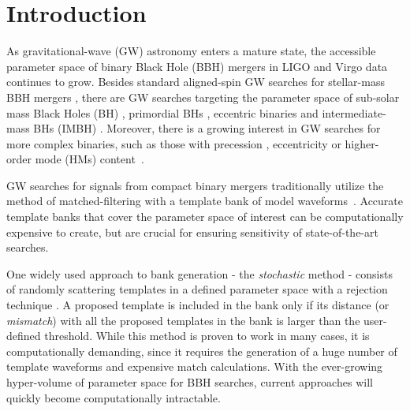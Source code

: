 \documentclass[twocolumn,showpacs,preprintnumbers,nofootinbib,prd,
superscriptaddress,10pt]{revtex4-2}
\begin{document}

\section{Introduction}

As gravitational-wave (GW) astronomy enters a mature state, the accessible parameter space of binary Black Hole (BBH) mergers in LIGO \cite{LIGOScientific:2014pky} and Virgo \cite{VIRGO:2014yos} data continues to grow. Besides standard aligned-spin GW searches for stellar-mass BBH mergers \cite{GWTC-1,GWTC-2,GWTC-2.1, GWTC-3}, there are GW searches targeting the parameter space of sub-solar mass Black Holes (BH) \cite{SSM_O2, SSM_O3a, PhysRevD.106.023024, Nitz:2021mzz}, primordial BHs \cite{PBH}, eccentric binaries \cite{PhysRevD.102.043005, PhysRevD.104.104016, Nitz:2019spj} and intermediate-mass BHs (IMBH) \cite{IMBH_O2, IMBH_O3, Chandra:2022ixv}. Moreover, there is a growing interest in GW searches for more complex binaries, such as those with precession \cite{PhysRevD.89.024010, Harry:2017weg, PhysRevD.102.041302, Indik:2016qky, Harry:2016ijz}, eccentricity \cite{LIGOScientific:2019dag, Ramos-Buades:2020eju, Wang:2021qsu, Nitz:2021mzz} or higher-order mode (HMs) content~\cite{CalderonBustillo:2015lrt, Harry:2017weg, Chandra_hom, 2021PhRvD.103b4042M}.

GW searches for signals from compact binary mergers traditionally utilize the method of matched-filtering with a template bank of model waveforms~\cite{Sathyaprakash:1991mt, Dhurandhar:1992mw, Owen:1998dk, Allen:2005fk, Babak:2006ty, Cokelaer:2007mv}. Accurate template banks that cover the parameter space of interest can be computationally expensive to create, but are crucial for ensuring sensitivity of state-of-the-art searches.

One widely used approach to bank generation - the {\it stochastic} method \cite{Harry:2009ea, PhysRevD.80.104014, Ajith:2012mn} - consists of randomly scattering templates in a defined parameter space with a rejection technique \cite{DalCanton:2017ala, Mukherjee:2018yra, Indik:2016qky, Lenon:2021zac}. A proposed template is included in the bank only if its distance (or {\it mismatch}) with all the proposed templates in the bank is larger than the user-defined threshold.
While this method is proven to work in many cases, it is computationally demanding, since it requires the generation of a huge number of template waveforms and expensive match calculations.
With the ever-growing hyper-volume of parameter space for BBH searches, current approaches will quickly become computationally intractable.
\end{document}
